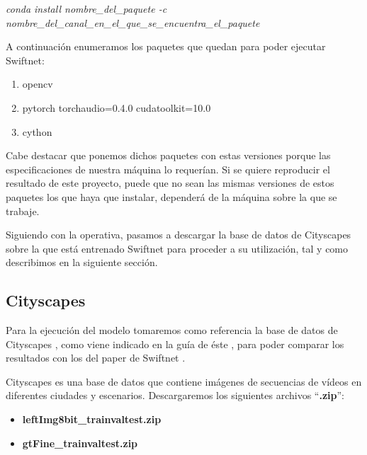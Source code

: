 \begin{center}
\textit{conda install nombre\_del\_paquete -c nombre\_del\_canal\_en\_el\_que\_se\_encuentra\_el\_paquete}
\end{center}

A continuación enumeramos los paquetes que quedan para poder ejecutar Swiftnet:

\begin{enumerate}
\item opencv \cite{opencv}
\item pytorch torchaudio=0.4.0 cudatoolkit=10.0 \cite{pytorch}
\item cython \cite{cython}
\end{enumerate}

Cabe destacar que ponemos dichos paquetes con estas versiones porque las especificaciones de nuestra máquina lo requerían. Si se quiere reproducir el resultado de este proyecto, puede que no sean las mismas versiones de estos paquetes los que haya que instalar, dependerá de la máquina sobre la que se trabaje.

Siguiendo con la operativa, pasamos a descargar la base de datos de Cityscapes sobre la que está entrenado Swiftnet para proceder a su utilización, tal y como describimos en la siguiente sección.


\subsection{Cityscapes}

Para la ejecución del modelo tomaremos como referencia la base de datos de Cityscapes \cite{cityscapes}, como viene indicado en la guía de éste \cite{github_swiftnet}, para poder comparar los resultados con los del paper de Swiftnet \cite{swiftnet}.

Cityscapes es una base de datos que contiene imágenes de secuencias de vídeos en diferentes ciudades y escenarios. Descargaremos los siguientes archivos ``\textbf{.zip}'':

\begin{itemize}
\item \textbf{leftImg8bit\_trainvaltest.zip}
\item \textbf{gtFine\_trainvaltest.zip}
\end{itemize}

